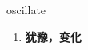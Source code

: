 
\begin{frame}
{\huge oscillate}
\begin{center}
\begin{enumerate}\Large
  \item \textbf{犹豫，变化}
\end{enumerate}
\end{center}
\end{frame}
